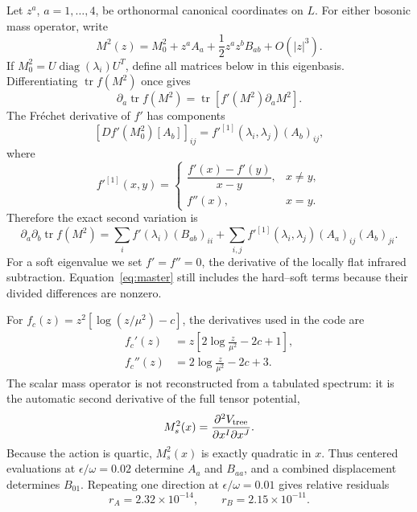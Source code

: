\documentclass[11pt]{article}
\newcommand{\tr}{\operatorname{tr}}
\newcommand{\diag}{\operatorname{diag}}
\begin{document}
Let \(z^a\), \(a=1,\ldots,4\), be orthonormal canonical coordinates on
\(L\).  For either bosonic mass operator, write
\begin{equation}
 M^2(z)=M_0^2+z^a A_a+\frac12z^az^b B_{ab}+O(|z|^3).
 \label{eq:massjet}
\end{equation}
If \(M_0^2=U\diag(\lambda_i)U^T\), define all matrices below in this
eigenbasis.  Differentiating \(\tr f(M^2)\) once gives
\begin{equation}
 \partial_a\tr f(M^2)=\tr\!\left[f'(M^2)\partial_aM^2\right].
 \label{eq:first}
\end{equation}
The Fr\'echet derivative of \(f'\) has components
\begin{equation}
 \left[D f'(M_0^2)[A_b]\right]_{ij}
 =f'^{[1]}(\lambda_i,\lambda_j)(A_b)_{ij},
 \label{eq:frechet}
\end{equation}
where
\begin{equation}
 f'^{[1]}(x,y)=
 \begin{cases}
 \dfrac{f'(x)-f'(y)}{x-y},&x\ne y,\\[6pt]
 f''(x),&x=y.
 \end{cases}
 \label{eq:divdiff}
\end{equation}
Therefore the exact second variation is
\begin{equation}
 \boxed{
 \partial_a\partial_b\tr f(M^2)=
 \sum_i f'(\lambda_i)(B_{ab})_{ii}
 +\sum_{i,j}f'^{[1]}(\lambda_i,\lambda_j)
 (A_a)_{ij}(A_b)_{ji}.}
 \label{eq:master}
\end{equation}
For a soft eigenvalue we set \(f'=f''=0\), the derivative of the locally
flat infrared subtraction.  Equation~\eqref{eq:master} still includes the
hard--soft terms because their divided differences are nonzero.

For \(f_c(z)=z^2[\log(z/\mu^2)-c]\), the derivatives used in the code are
\begin{align}
 f_c'(z)&=z\left[2\log\frac{z}{\mu^2}-2c+1\right],\nonumber\\
 f_c''(z)&=2\log\frac{z}{\mu^2}-2c+3.
 \label{eq:fderivatives}
\end{align}
The scalar mass operator is not reconstructed from a tabulated spectrum:
it is the automatic second derivative of the full tensor potential,
\begin{equation}
 M_s^2(x)=\frac{\partial^2V_{\rm tree}}
 {\partial x^I\partial x^J}.
 \label{eq:scalaroperator}
\end{equation}
Because the action is quartic, \(M_s^2(x)\) is exactly quadratic in \(x\).
Thus centered evaluations at \(\epsilon/\omega=0.02\) determine \(A_a\)
and \(B_{aa}\), and a combined displacement determines \(B_{01}\).
Repeating one direction at \(\epsilon/\omega=0.01\) gives relative residuals
\begin{equation}
 r_A=2.32\times10^{-14},\qquad r_B=2.15\times10^{-11}.
 \label{eq:steps}
\end{equation}
\end{document}
